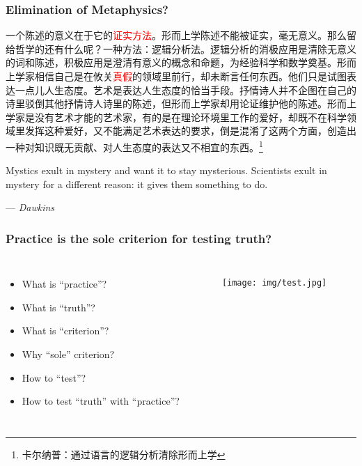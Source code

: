 \documentclass[UTF8,aspectratio=43,11pt,colorlinks,compress,openany]{beamer}%
\begin{document}
\begin{frame}\frametitle{Elimination of Metaphysics?}
	\begin{block}{}\small
		一个陈述的意义在于它的\textcolor{red}{证实方法}。形而上学陈述不能被证实，毫无意义。那么留给哲学的还有什么呢？一种方法：逻辑分析法。逻辑分析的消极应用是清除无意义的词和陈述，积极应用是澄清有意义的概念和命题，为经验科学和数学奠基。形而上学家相信自己是在攸关\textcolor{red}{真假}的领域里前行，却未断言任何东西。他们只是试图表达一点儿人生态度。艺术是表达人生态度的恰当手段。抒情诗人并不企图在自己的诗里驳倒其他抒情诗人诗里的陈述，但形而上学家却用论证维护他的陈述。形而上学家是没有艺术才能的艺术家，有的是在理论环境里工作的爱好，却既不在科学领域里发挥这种爱好，又不能满足艺术表达的要求，倒是混淆了这两个方面，创造出一种对知识既无贡献、对人生态度的表达又不相宜的东西。\footnote{卡尔纳普：通过语言的逻辑分析清除形而上学}
	\end{block}
			Mystics exult in mystery and want it to stay mysterious. Scientists exult in mystery for a different reason: it gives them something to do.\par
			\hfill --- \textsl{Dawkins}
\end{frame}

\begin{frame}\frametitle{Practice is the sole criterion for testing truth?}
\centering{}
	\begin{columns}[onlytextwidth]
				\begin{itemize}
					\item What is ``practice''?
					\item What is ``truth''?
					\item What is ``criterion''?
					\item Why ``sole'' criterion?
					\item How to ``test''?
					\item How to test ``truth'' with ``practice''?
				\end{itemize}
			\begin{figure}
				\texttt{[image: img/test.jpg]}
			\end{figure}
	\end{columns}
\end{frame}
\end{document}
